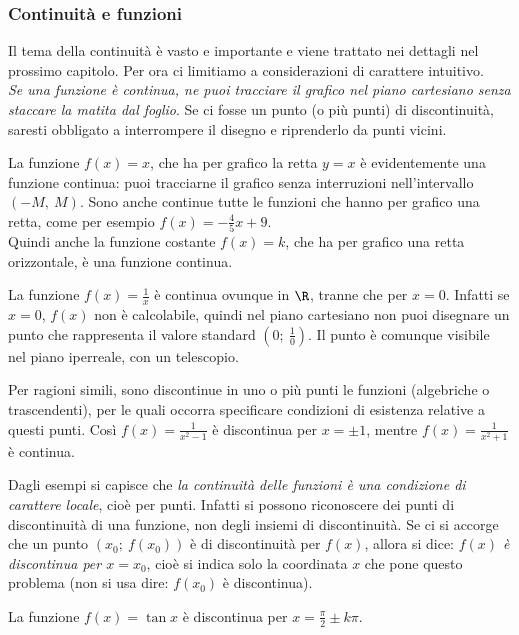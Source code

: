 \subsubsection{Continuità e funzioni}
\label{subsubsec:diff01_diffcontinue}
Il tema della continuità è vasto e importante e viene trattato nei dettagli
nel prossimo capitolo. Per ora ci limitiamo a considerazioni di carattere 
intuitivo.\\
\emph{Se una funzione è continua, ne puoi tracciare il grafico nel piano 
cartesiano 
senza staccare la matita dal foglio}. Se ci fosse un punto (o più punti)
di discontinuità, saresti obbligato a interrompere il disegno e riprenderlo
da punti vicini.
\begin{esempio}
 La funzione $f(x)=x$, che ha per grafico la retta $y=x$ è evidentemente 
 una funzione continua: puoi tracciarne il grafico senza interruzioni
 nell'intervallo $(-M,\ M)$. Sono anche continue tutte le funzioni che hanno
 per grafico una retta, come per esempio $f(x)=-\frac{4}{5}x+9$.\\
 Quindi anche la funzione costante $f(x)=k$, che ha per grafico una retta
 orizzontale, è una funzione continua.
\end{esempio}
\begin{esempio}
 La funzione $f(x)=\frac{1}{x}$ è continua ovunque in $\R$, tranne che per 
$x=0$.
 Infatti se $x=0$, $f(x)$ non è calcolabile, quindi nel piano cartesiano 
 non puoi disegnare un punto  che rappresenta il valore standard 
 $(0;\ \frac{1}{0})$. Il punto è comunque visibile nel piano iperreale, con un
 telescopio.
 \end{esempio}
\begin{esempio}
 Per ragioni simili, sono discontinue in uno o più punti le funzioni
 (algebriche o trascendenti), per le quali occorra specificare condizioni 
 di esistenza relative a questi punti.
 Così $f(x)=\frac{1}{x^2-1}$ è discontinua per $x=\pm 1$, mentre 
 $f(x)=\frac{1}{x^2+1}$ è continua.
\end{esempio}

Dagli esempi si capisce che \emph{la continuità delle funzioni è una 
condizione 
di carattere locale}, cioè per punti. Infatti si possono riconoscere dei punti
di discontinuità di una funzione, non degli insiemi di discontinuità.
Se ci si accorge che un punto $(x_0;\ f(x_0))$ è di discontinuità
per $f(x)$, allora si dice: \emph{$f(x)$ è discontinua per $x=x_0$},
cioè si indica solo la coordinata $x$ che pone questo problema 
(non si usa dire: $f(x_0)$ è discontinua).
\begin{esempio}
 La funzione $f(x)= \tan x$ è discontinua per $x=\frac{\pi}{2}\pm k\pi$.
\end{esempio}

